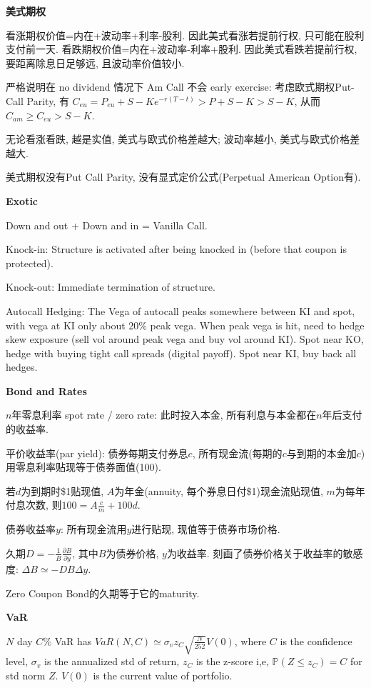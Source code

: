\documentclass[UTF8]{ctexart}
\begin{document}
\noindent \textbf{美式期权} \par
看涨期权价值=内在+波动率+利率-股利. 因此美式看涨若提前行权, 只可能在股利支付前一天.
看跌期权价值=内在+波动率-利率+股利. 因此美式看跌若提前行权, 要距离除息日足够远, 且波动率价值较小.

严格说明在 no dividend 情况下 Am Call 不会 early exercise:
考虑欧式期权Put-Call Parity, 有 $C_{eu} = P_{eu} + S - Ke^{-r(T-t)} > P + S - K > S - K$,
从而 $C_{am} \geq C_{eu}>S-K$.

无论看涨看跌, 越是实值, 美式与欧式价格差越大; 波动率越小, 美式与欧式价格差越大.

美式期权没有Put Call Parity, 没有显式定价公式(Perpetual American Option有).


\noindent \textbf{Exotic} \par
Down and out + Down and in = Vanilla Call.

Knock-in: Structure is activated after being knocked in (before that coupon is protected).

Knock-out: Immediate termination of structure.

Autocall Hedging: 
The Vega of autocall peaks somewhere between KI and spot, with vega at KI only about 20\% peak vega.
When peak vega is hit, need to hedge skew exposure (sell vol around peak vega and buy vol around KI).
Spot near KO, hedge with buying tight call spreads (digital payoff).
Spot near KI, buy back all hedges.


\noindent \textbf{Bond and Rates} \par

$n$年零息利率 spot rate / zero rate: 此时投入本金, 所有利息与本金都在$n$年后支付的收益率.

平价收益率(par yield): 债券每期支付券息$c$, 所有现金流(每期的$c$与到期的本金加$c$)用零息利率贴现等于债券面值(100).

若$d$为到期时\$1贴现值, $A$为年金(annuity, 每个券息日付\$1)现金流贴现值, $m$为每年付息次数, 则$100=A\frac{c}{m}+100d$.

债券收益率$y$: 所有现金流用$y$进行贴现, 现值等于债券市场价格.

久期$D=-\frac{1}{B}\frac{\partial B}{\partial y}$, 其中$B$为债券价格, $y$为收益率. 刻画了债券价格关于收益率的敏感度: $\Delta B\simeq -DB\Delta y$.

Zero Coupon Bond的久期等于它的maturity.


\noindent \textbf{VaR} \par

$N$ day $C\%$ VaR has $VaR(N,C)\simeq \sigma_v z_C \sqrt{\frac{N}{252}}V(0)$,
where $C$ is the confidence level, $\sigma_v$ is the annualized std of return, $z_C$ is the z-score i,e, $\mathbb{P}(Z\leq z_C)=C$ for std norm $Z$.
$V(0)$ is the current value of portfolio.
\end{document}
